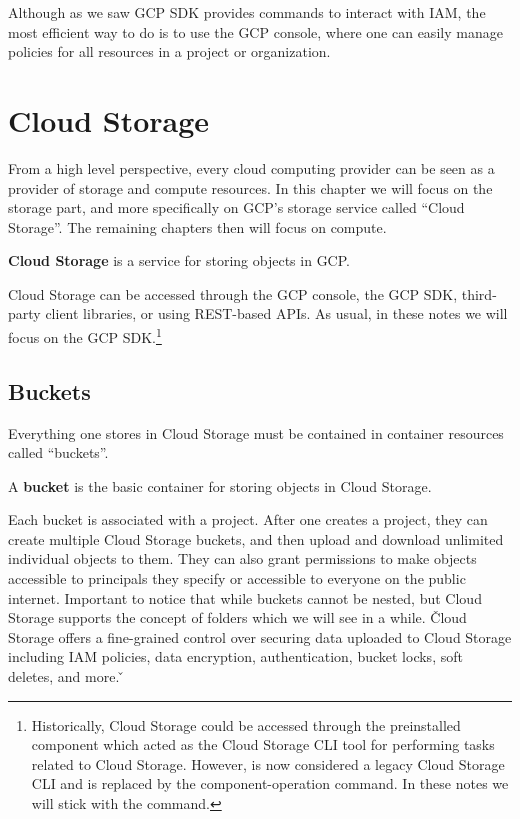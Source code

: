 Although as we saw GCP SDK provides commands to interact with IAM, the most efficient way to do is to use the GCP
console, where one can easily manage policies for all resources in a project or organization.

\section{Cloud Storage}

From a high level perspective, every cloud computing provider can be seen as a provider of storage and compute
resources. In this chapter we will focus on the storage part, and more specifically on GCP's storage service called
``Cloud Storage''. The remaining chapters then will focus on compute.

\textbf{Cloud Storage} is a service for storing objects in GCP\@.
\ed

Cloud Storage can be accessed through the GCP console, the GCP SDK, third-party client libraries, or using REST-based
APIs. As usual, in these notes we will focus on the GCP SDK\@.\footnote{Historically, Cloud Storage could be accessed
through the preinstalled  component which acted as the Cloud Storage CLI tool for performing tasks related
to Cloud Storage. However,  is now considered a legacy Cloud Storage CLI and is replaced by the
 component-operation command. In these notes we will stick with the  command.}

\subsection{Buckets}

Everything one stores in Cloud Storage must be contained in container resources called ``buckets''.

\bd[Bucket]
A \textbf{bucket} is the basic container for storing objects in Cloud Storage.
\ed

Each bucket is associated with a project. After one creates a project, they can create multiple Cloud Storage buckets,
and then upload and download unlimited individual objects to them. They can also grant permissions to make objects
accessible to principals they specify or accessible to everyone on the public internet. Important to notice that while
buckets cannot be nested, but Cloud Storage supports the concept of folders which we will see in a while. \v

Cloud Storage offers a fine-grained control over securing data uploaded to Cloud Storage including IAM policies, data
encryption, authentication, bucket locks, soft deletes, and more. \v

